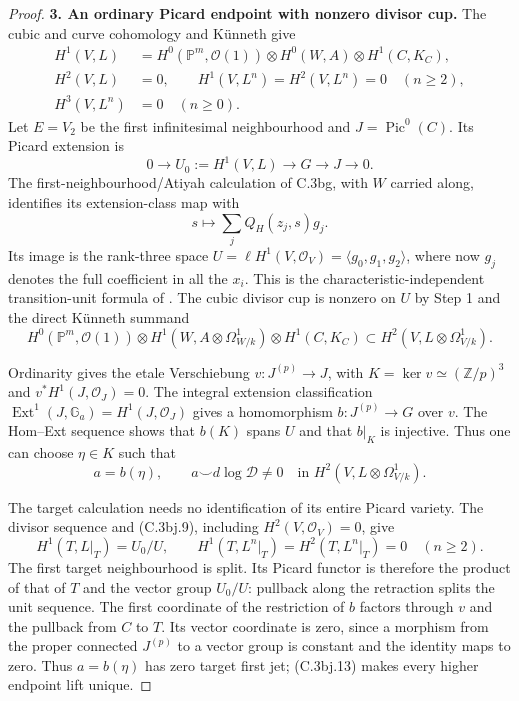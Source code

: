 \begin{proof}
\textbf{3. An ordinary Picard endpoint with nonzero divisor cup.}
The cubic and curve cohomology and K\"unneth give
\[
 \begin{split}
 H^1(V,L)&=H^0(\mathbb P^m,\mathcal O(1))\otimes H^0(W,A)
                       \otimes H^1(C,K_C),\\
 H^2(V,L)&=0,\qquad
 H^1(V,L^n)=H^2(V,L^n)=0\quad(n\ge2),\\
 H^3(V,L^n)&=0\quad(n\ge0).
 \end{split}
 \tag{C.3bj.9}
\]
Let $E=V_2$ be the first infinitesimal neighbourhood and
$J=\operatorname{Pic}^0(C)$. Its Picard extension is
\[
 0\longrightarrow U_0:=H^1(V,L)\longrightarrow G
                      \longrightarrow J\longrightarrow0.
 \tag{C.3bj.10}
\]
The first-neighbourhood/Atiyah calculation of C.3bg, with $W$ carried
along, identifies its extension-class map with
\[
 s\longmapsto\sum_jQ_H(z_j,s)g_j.
\]
Its image is the rank-three space
$U=\ell H^1(V,\mathcal O_V)=\langle g_0,g_1,g_2\rangle$,
where now $g_j$ denotes the full coefficient in all the $x_i$.
This is the characteristic-independent transition-unit formula of
\citet[Theorem 2.6 and formula (2.7.2), pp.~166--167]{D_Illusie1972Torsors}.
The cubic divisor cup is nonzero on $U$ by Step 1 and the direct
K\"unneth summand
\[
 H^0(\mathbb P^m,\mathcal O(1))\otimes
 H^1(W,A\otimes\Omega^1_{W/k})\otimes H^1(C,K_C)
 \subset H^2(V,L\otimes\Omega^1_{V/k}).
 \tag{C.3bj.11}
\]

Ordinarity gives the etale Verschiebung $v:J^{(p)}\to J$, with
$K=\ker v\simeq(\mathbb Z/p)^3$ and $v^*H^1(J,\mathcal O_J)=0$.
The integral extension classification
$\operatorname{Ext}^1(J,\mathbb G_a)=H^1(J,\mathcal O_J)$
\citep[Section 3.2.3, equation (3.8), p.~23]{D_BrionIsogenyII}
gives a homomorphism $b:J^{(p)}\to G$ over $v$.
The Hom--Ext sequence shows that $b(K)$ spans $U$ and that $b|_K$
is injective. Thus one can choose $\eta\in K$ such that
\[
 a=b(\eta),\qquad
 a\smile d\log\mathcal D\ne0\quad
       \text{in }H^2(V,L\otimes\Omega^1_{V/k}).
 \tag{C.3bj.12}
\]

The target calculation needs no identification of its entire Picard
variety. The divisor sequence and (C.3bj.9), including
$H^2(V,\mathcal O_V)=0$, give
\[
 H^1(T,L|_T)=U_0/U,\qquad
 H^1(T,L^n|_T)=H^2(T,L^n|_T)=0\quad(n\ge2).
 \tag{C.3bj.13}
\]
The first target neighbourhood is split. Its Picard functor is therefore
the product of that of $T$ and the vector group $U_0/U$: pullback
along the retraction splits the unit sequence. The first coordinate
of the restriction of $b$ factors through $v$ and the pullback from
$C$ to $T$. Its vector coordinate is zero, since a morphism from the
proper connected $J^{(p)}$ to a vector group is constant and the
identity maps to zero. Thus $a=b(\eta)$ has zero target first jet;
(C.3bj.13) makes every higher endpoint lift unique.


\end{proof}
